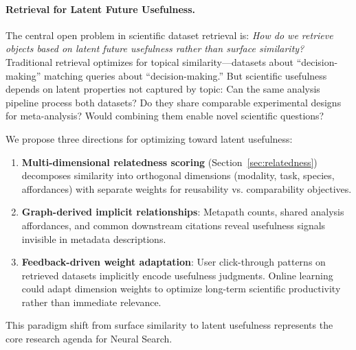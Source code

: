 \documentclass{article}
\theoremstyle{definition}
\begin{document}
\paragraph{Retrieval for Latent Future Usefulness.} The central open problem in scientific dataset retrieval is: \textit{How do we retrieve objects based on latent future usefulness rather than surface similarity?} Traditional retrieval optimizes for topical similarity---datasets about ``decision-making'' matching queries about ``decision-making.'' But scientific usefulness depends on latent properties not captured by topic: Can the same analysis pipeline process both datasets? Do they share comparable experimental designs for meta-analysis? Would combining them enable novel scientific questions?

We propose three directions for optimizing toward latent usefulness:
\begin{enumerate}
    \item \textbf{Multi-dimensional relatedness scoring} (Section~\ref{sec:relatedness}) decomposes similarity into orthogonal dimensions (modality, task, species, affordances) with separate weights for reusability vs. comparability objectives.

    \item \textbf{Graph-derived implicit relationships}: Metapath counts, shared analysis affordances, and common downstream citations reveal usefulness signals invisible in metadata descriptions.

    \item \textbf{Feedback-driven weight adaptation}: User click-through patterns on retrieved datasets implicitly encode usefulness judgments. Online learning could adapt dimension weights to optimize long-term scientific productivity rather than immediate relevance.
\end{enumerate}

This paradigm shift from surface similarity to latent usefulness represents the core research agenda for Neural Search.
\end{document}
